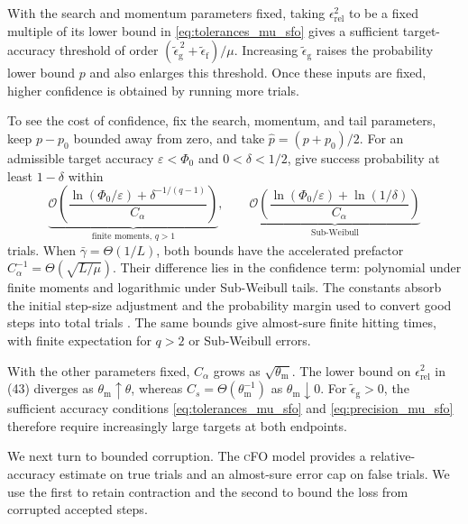 \documentclass{article}
\begin{document}
\begin{remark}
\label{rem:admissible_p_mu_sfo}
With the search and momentum parameters fixed, taking
\(\epsilon_{\mathrm{rel}}^2\) to be a fixed multiple of its
lower bound in \eqref{eq:tolerances_mu_sfo} gives a sufficient
target-accuracy threshold of order
\((\widetilde\epsilon_{\mathrm g}^{\,2}
+\widetilde\epsilon_{\mathrm f})/\mu\).
Increasing \(\widetilde\epsilon_{\mathrm g}\) raises the
probability lower bound \(p\) and also enlarges this threshold.
Once these inputs are fixed, higher confidence is obtained
by running more trials.

To see the cost of confidence, fix the search, momentum, and tail parameters, keep $p-p_0$ bounded away from zero, and take $\hat p=(p+p_0)/2$. For an admissible target accuracy $\varepsilon<\Phi_0$ and $0<\delta<1/2$,  give success probability at least $1-\delta$ within
\[
\underbrace{
\mathcal O\!\left(
\frac{\ln(\Phi_0/\varepsilon)+\delta^{-1/(q-1)}}{C_\alpha}
\right)
}_{\text{finite moments, }q>1},
\qquad
\underbrace{
\mathcal O\!\left(
\frac{\ln(\Phi_0/\varepsilon)+\ln(1/\delta)}{C_\alpha}
\right)
}_{\text{Sub-Weibull}}
\] trials.
When $\bar\gamma=\Theta(1/L)$, both bounds have the accelerated prefactor $C_\alpha^{-1}=\Theta(\sqrt{L/\mu})$. Their difference lies in the confidence term: polynomial under finite moments and logarithmic under Sub-Weibull tails. The constants absorb the initial step-size adjustment and the probability margin used to convert good steps into total trials \cite{Cartis2018,Albert2021}. The same bounds give almost-sure finite hitting times, with finite expectation for $q>2$ or Sub-Weibull errors.

With the other parameters fixed, $C_\alpha$ grows as $\sqrt{\theta_{\mathrm m}}$. The lower bound on $\epsilon_{\mathrm{rel}}^2$ in (43) diverges as $\theta_{\mathrm m}\uparrow\theta$, whereas $C_s=\Theta(\theta_{\mathrm m}^{-1})$ as $\theta_{\mathrm m}\downarrow0$. For $\widetilde\epsilon_{\mathrm g}>0$, the sufficient accuracy conditions \eqref{eq:tolerances_mu_sfo} and \eqref{eq:precision_mu_sfo} therefore require increasingly large targets at both endpoints.
\end{remark}

We next turn to bounded corruption. The \textsc{cFO} model provides a relative-accuracy estimate on true trials and an almost-sure error cap on false trials. We use the first to retain contraction and the second to bound the loss from corrupted accepted steps.
\end{document}
